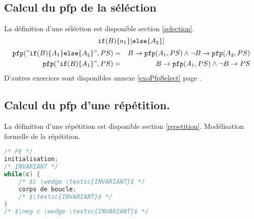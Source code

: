 \subsection{Calcul du pfp de la séléction}\label{pfpselection} 
		La définition d'une séléction est disponible section \ref{selection}.
		$$\ifp (B)\{a_1\} [\elsep \{A_2\}]$$
\begin{eqnarray*}
	\texttt{pfp}("\texttt{if}(B)\{A_1\}\texttt{else}\{A_2\}", PS) &=&
	B \rightarrow \texttt{pfp}(A_1, PS) \wedge \neg B \rightarrow \texttt{pfp} (A_2, PS)\\
	\texttt{pfp}("\texttt{if}(B)\{A_1\}", PS) &=& B \rightarrow \texttt{pfp}(A_1, PS) \wedge \neg B \rightarrow PS 
\end{eqnarray*}
D'autres exercices sont disponibles annexe \ref{exoPfpSelect} page \pageref{exoPfpSelect}.

\subsection{Calcul du pfp d'une répétition.}\label{pfpBoucle}
		La définition d'une répétition est disponible section \ref{repetition}.
Modélisation formelle de la répétition.
\begin{lstlisting}[language=C]
/* PE */
initialisation;
/* INVARIANT */
while(c) {
	/* $c \wedge \textsc{INVARIANT}$ */
	corps de boucle;
	/* $\textsc{INVARIANT}$ */
}
/* $\neg c \wedge \textsc{INVARIANT}$ */
\end{lstlisting}

